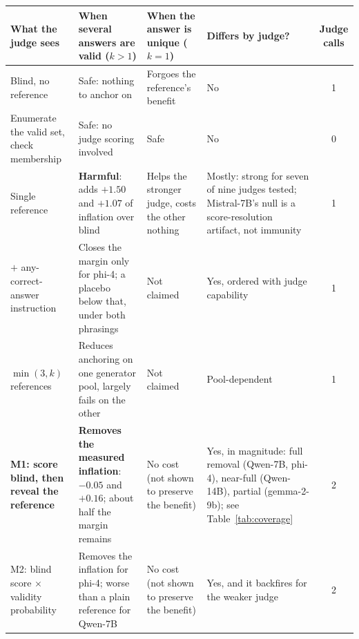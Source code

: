 \documentclass[11pt]{article}
\begin{document}
\begin{table}[tbp]
\centering
\footnotesize
\setlength{\tabcolsep}{3pt}
\begin{tabular}{L{3.3cm}L{4.3cm}L{2.6cm}L{2.6cm}c}
\toprule
What the judge sees & When several answers are valid ($k{>}1$) & When the answer is unique ($k{=}1$) & Differs by judge? & Judge calls \\
\midrule
Blind, no reference & Safe: nothing to anchor on & Forgoes the reference's benefit & No & 1 \\
\addlinespace
Enumerate the valid set, check membership & Safe: no judge scoring involved & Safe & No & 0 \\
\addlinespace
Single reference & \textbf{Harmful}: adds $+1.50$ and $+1.07$ of inflation over blind & Helps the stronger judge, costs the other nothing & Mostly: strong for seven of nine judges tested; Mistral-7B's null is a score-resolution artifact, not immunity & 1 \\
\addlinespace
$+$ any-correct-answer instruction & Closes the margin only for phi-4; a placebo below that, under both phrasings & Not claimed & Yes, ordered with judge capability & 1 \\
\addlinespace
$\min(3,k)$ references & Reduces anchoring on one generator pool, largely fails on the other & Not claimed & Pool-dependent & 1 \\
\addlinespace
\textbf{M1: score blind, then reveal the reference} & \textbf{Removes the measured inflation}: $-0.05$ and $+0.16$; about half the margin remains & No cost (not shown to preserve the benefit) & Yes, in magnitude: full removal (Qwen-7B, phi-4), near-full (Qwen-14B), partial (gemma-2-9b); see Table~\ref{tab:coverage} & 2 \\
\addlinespace
M2: blind score $\times$ validity probability & Removes the inflation for phi-4; worse than a plain reference for Qwen-7B & No cost (not shown to preserve the benefit) & Yes, and it backfires for the weaker judge & 2 \\
\bottomrule
\end{tabular}


\end{table}
\end{document}
